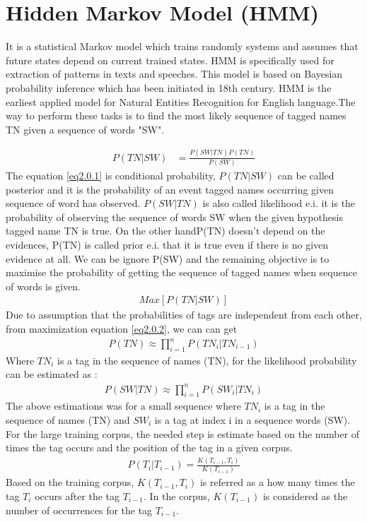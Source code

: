\section{Hidden Markov Model (HMM)}
It is a statistical Markov model which trains randomly systems and assumes that future states depend on current trained states.
HMM is specifically used for extraction of patterns in texts and speeches.
This model is based on Bayesian probability inference which has been initiated in 18th century. HMM is the earliest applied model for Natural Entities Recognition for English language.The way to perform these tasks is to find the most likely sequence of tagged names TN given a sequence of words "SW".

\begin{align}
P(TN|SW) & = \frac{P(SW|TN)P(TN)}{P(SW)}\label{eq2.0.1}
\end{align}
The equation  \eqref{eq2.0.1} is conditional probability, $P(TN|SW)$ can be  called posterior and it is  the probability of an event   tagged names occurring given sequence of word has observed.
$P(SW|TN)$ is also called likelihood e.i.  it is the probability of observing the sequence of words SW when the given hypothesis tagged name  TN is true. On the other handP(TN) doesn’t depend on the evidences, P(TN) is called prior e.i.  that it is true even if there is no given evidence at all. 
We can be ignore P(SW) and the remaining objective is to maximise the probability of getting the sequence of tagged names when sequence of words is given.
\begin{align}
Max\left[P(TN|SW)\right] \label{eq2.0.2}
\end{align} Due to assumption that the probabilities of tags are independent from each other,  from maximization equation \eqref{eq2.0.2},  we can  can get 
\begin{align}
P(TN){\approx} \prod_{i=1}^{n} P({TN}_{i}|{TN}_{i-1})\label{2.0.3}
\end{align}
Where ${TN}_{i}$ is a tag in the sequence of names (TN), for the likelihood probability can be estimated as :
\begin{align}
P(SW|TN){\approx}\prod_{i=1}^{n} P({SW}_{i}|{TN}_{i})\label{2.0.4}
\end{align}
The above estimations was for a small sequence where ${TN}_{i}$ is a tag in the sequence of names (TN) and ${SW}_{i}$ is a tag at index i in a sequence words (SW). For the large training corpus, the needed step is estimate based on the number of times the tag occurs and the position of the tag in a given corpus.
\begin{align}
P(T_{i}|T_{i-1}) = \frac{K(T_{i-1},T_{i})}{K(T_{i-1})}\label{2.0.5}
\end{align}
Based on the training corpus, $K(T_{i-1},T_{i})$ is referred as a how many times the tag $T_{i}$ occurs after the tag $T_{i-1}$. In the corpus, $K(T_{i-1})$ is considered as the number of occurrences for the tag $T_{i-1}$.

